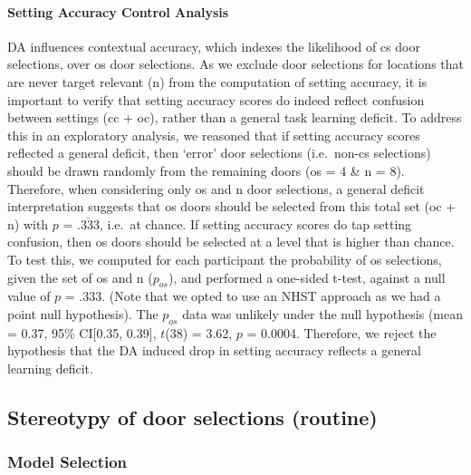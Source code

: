 \documentclass{article}
\begin{document}
\hypertarget{setting-accuracy-control-analysis}{%
\paragraph{Setting Accuracy Control
Analysis}\label{setting-accuracy-control-analysis}}

DA influences contextual accuracy, which indexes the likelihood of cs
door selections, over os door selections. As we exclude door selections
for locations that are never target relevant (n) from the computation of
setting accuracy, it is important to verify that setting accuracy scores
do indeed reflect confusion between settings (cc + oc), rather than a
general task learning deficit. To address this in an exploratory
analysis, we reasoned that if setting accuracy scores reflected a
general deficit, then `error' door selections (i.e.~non-cs selections)
should be drawn randomly from the remaining doors (os = 4 \& n = 8).
Therefore, when considering only os and n door selections, a general
deficit interpretation suggests that os doors should be selected from
this total set (oc + n) with \(p\) = \(\overline{.333}\), i.e.~at
chance. If setting accuracy scores do tap setting confusion, then os
doors should be selected at a level that is higher than chance. To test
this, we computed for each participant the probability of os selections,
given the set of os and n (\(p_{os}\)), and performed a one-sided
t-test, against a null value of \(p\) = .333. (Note that we opted to use
an NHST approach as we had a point null hypothesis). The \(p_{os}\) data
was unlikely under the null hypothesis (mean = 0.37, 95\% CI{[}0.35,
0.39{]}, \(t\)(38) = 3.62, \(p\) = 0.0004. Therefore, we reject the
hypothesis that the DA induced drop in setting accuracy reflects a
general learning deficit.

\hypertarget{stereotypy-of-door-selections-routine}{%
\subsection{Stereotypy of door selections
(routine)}\label{stereotypy-of-door-selections-routine}}

\hypertarget{model-selection-2}{%
\subsubsection{Model Selection}\label{model-selection-2}}
\end{document}
